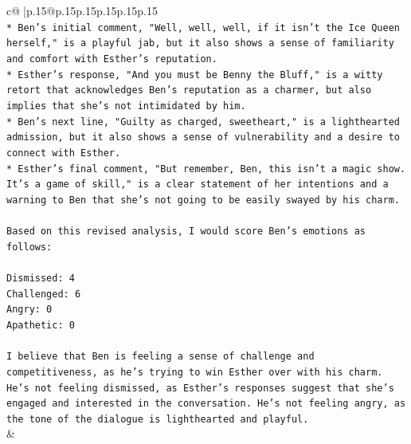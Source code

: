 \documentclass{article}
\begin{document}
{\begin{supertabular}{c@{$\;$}|p{.15\linewidth}@{}p{.15\linewidth}p{.15\linewidth}p{.15\linewidth}p{.15\linewidth}p{.15\linewidth}}
{{{\\ 
\texttt{* Ben's initial comment, "Well, well, well, if it isn't the Ice Queen herself," is a playful jab, but it also shows a sense of familiarity and comfort with Esther's reputation.} \\
\texttt{* Esther's response, "And you must be Benny the Bluff," is a witty retort that acknowledges Ben's reputation as a charmer, but also implies that she's not intimidated by him.} \\
\texttt{* Ben's next line, "Guilty as charged, sweetheart," is a lighthearted admission, but it also shows a sense of vulnerability and a desire to connect with Esther.} \\
\texttt{* Esther's final comment, "But remember, Ben, this isn't a magic show. It's a game of skill," is a clear statement of her intentions and a warning to Ben that she's not going to be easily swayed by his charm.} \\
\\ 
\texttt{Based on this revised analysis, I would score Ben's emotions as follows:} \\
\\ 
\texttt{Dismissed: 4} \\
\texttt{Challenged: 6} \\
\texttt{Angry: 0} \\
\texttt{Apathetic: 0} \\
\\ 
\texttt{I believe that Ben is feeling a sense of challenge and competitiveness, as he's trying to win Esther over with his charm. He's not feeling dismissed, as Esther's responses suggest that she's engaged and interested in the conversation. He's not feeling angry, as the tone of the dialogue is lighthearted and playful.} \\
            }
        }
    }
    & \\ \\

\end{supertabular}
}
\end{document}
